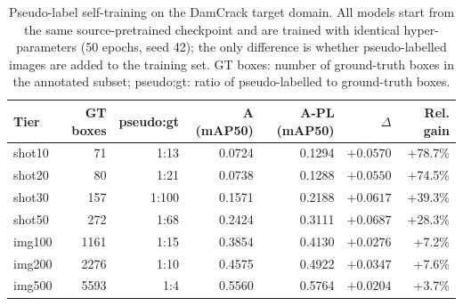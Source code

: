 \begin{table}[htbp]
\centering
\caption{Pseudo-label self-training on the DamCrack target domain. All models start from the same source-pretrained checkpoint and are trained with identical hyper-parameters (50 epochs, seed 42); the only difference is whether pseudo-labelled images are added to the training set. GT boxes: number of ground-truth boxes in the annotated subset; pseudo:gt: ratio of pseudo-labelled to ground-truth boxes.}
\label{tab:pseudo-label}
\begin{tabular}{lrrrrrr}
\toprule
Tier & GT boxes & pseudo:gt & A (mAP50) & A-PL (mAP50) & $\Delta$ & Rel. gain \\
\midrule
shot10 & 71 & 1:13 & 0.0724 & 0.1294 & $+0.0570$ & +78.7\% \\
shot20 & 80 & 1:21 & 0.0738 & 0.1288 & $+0.0550$ & +74.5\% \\
shot30 & 157 & 1:100 & 0.1571 & 0.2188 & $+0.0617$ & +39.3\% \\
shot50 & 272 & 1:68 & 0.2424 & 0.3111 & $+0.0687$ & +28.3\% \\
img100 & 1161 & 1:15 & 0.3854 & 0.4130 & $+0.0276$ & +7.2\% \\
img200 & 2276 & 1:10 & 0.4575 & 0.4922 & $+0.0347$ & +7.6\% \\
img500 & 5593 & 1:4 & 0.5560 & 0.5764 & $+0.0204$ & +3.7\% \\
\bottomrule
\end{tabular}
\end{table}
